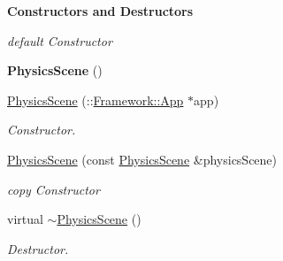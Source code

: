\begin{Indent}{\bf Constructors and Destructors}\par
{\em \label{_amgrp64fb2b8a2107864a2f56d3f7cc47f3aa}
 default Constructor }\begin{DoxyCompactItemize}
\item 
\hypertarget{classContent_1_1Physics_1_1PhysicsScene_a89717617805fbd5b43e5a8980c28bf46}{
{\bfseries PhysicsScene} ()}
\label{classContent_1_1Physics_1_1PhysicsScene_a89717617805fbd5b43e5a8980c28bf46}

\item 
\hypertarget{classContent_1_1Physics_1_1PhysicsScene_a0bf13a90533d0e92b7916888c6358c85}{
\hyperlink{classContent_1_1Physics_1_1PhysicsScene_a0bf13a90533d0e92b7916888c6358c85}{PhysicsScene} (::\hyperlink{classFramework_1_1App}{Framework::App} $\ast$app)}
\label{classContent_1_1Physics_1_1PhysicsScene_a0bf13a90533d0e92b7916888c6358c85}

\begin{DoxyCompactList}\small\item\em Constructor. \item\end{DoxyCompactList}\item 
\hypertarget{classContent_1_1Physics_1_1PhysicsScene_a56ce8277aa08bdd1cb349a15dc05f92e}{
\hyperlink{classContent_1_1Physics_1_1PhysicsScene_a56ce8277aa08bdd1cb349a15dc05f92e}{PhysicsScene} (const \hyperlink{classContent_1_1Physics_1_1PhysicsScene}{PhysicsScene} \&physicsScene)}
\label{classContent_1_1Physics_1_1PhysicsScene_a56ce8277aa08bdd1cb349a15dc05f92e}

\begin{DoxyCompactList}\small\item\em copy Constructor \item\end{DoxyCompactList}\item 
\hypertarget{classContent_1_1Physics_1_1PhysicsScene_a51d0d2d9fc74219fd8f52b53bae1772f}{
virtual \hyperlink{classContent_1_1Physics_1_1PhysicsScene_a51d0d2d9fc74219fd8f52b53bae1772f}{$\sim$PhysicsScene} ()}
\label{classContent_1_1Physics_1_1PhysicsScene_a51d0d2d9fc74219fd8f52b53bae1772f}

\begin{DoxyCompactList}\small\item\em Destructor. \item\end{DoxyCompactList}\end{DoxyCompactItemize}
\end{Indent}
